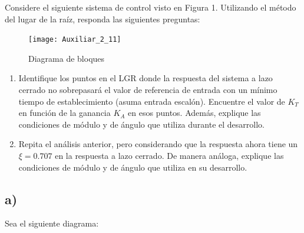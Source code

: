 \documentclass[
  11pt,
  letterpaper,
   addpoints,
   answers
  ]{exam}
\begin{document}
\begin{questions}
    \question Considere el siguiente sistema de control visto en Figura 1. Utilizando el método del lugar de la raíz, responda las siguientes preguntas:
    \begin{figure}[h]
        \centering
        \texttt{[image: Auxiliar\_2\_11]}
        \caption{Diagrama de bloques}
    \end{figure}
    \begin{enumerate}
        \item Identifique los puntos en el LGR donde la respuesta del sistema a lazo cerrado no sobrepasará el valor de referencia de entrada con un mínimo tiempo de establecimiento (asuma entrada escalón). Encuentre el valor de \(K_T\) en función de la ganancia \(K_A\) en esos puntos. Además, explique las condiciones de módulo y de ángulo que utiliza durante el desarrollo.
        \item Repita el análisis anterior, pero considerando que la respuesta ahora tiene un \(\xi=0.707\) en la respuesta a lazo cerrado. De manera análoga, explique las condiciones de módulo y de ángulo que utiliza en su desarrollo.
    \end{enumerate}
\begin{solution}
    \subsection*{a)}
    
\end{solution}
    
    \question Sea el siguiente diagrama:
    \begin{center}

\end{center}
\end{questions}
\end{document}
